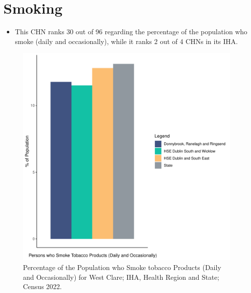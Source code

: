 \documentclass{article}
\begin{document}
\pagebreak

\section{Smoking}\label{sect:Smoking}
\begin{itemize}
\item This CHN ranks  30 out of 96 regarding the percentage of the population who smoke (daily and occasionally), while it ranks   2 out of 4 CHNs in its IHA.
\end{itemize}
\begin{figure}[H]
	\centering
	\includegraphics[width = 120mm]{../figures/SmokingED.pdf}
	\caption{Percentage of the Population who Smoke tobacco Products (Daily and Occasionally) for West Clare; IHA, Health Region and State; Census 2022.}
	\label{fig:2ae19629-1a6a-13a3-e055-000000000001}
	\end{figure}
	
\end{document}
